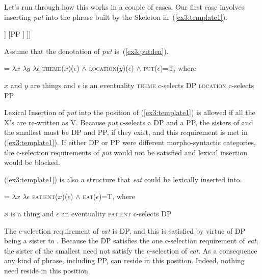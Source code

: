 Let's run through how this works in a couple of cases. Our first case involves inserting \emph{put} into the phrase built by the  Skeleton in~(\ref{ex3:template1}).
\begin{exe}
	\raggedright
	\ex \label{ex3:template1} 
	\small
	\begin{forest}
	[XP [\ibar{X}
		[\ibar{X} 
			[\obar{X} ]
			[DP ]
		]
		[PP ]
	]]
	\end{forest}
\end{exe}
Assume that the denotation of \emph{put} is~(\ref{ex3:putden}).
\begin{exe}
	\raggedright
	\ex \label{ex3:putden} 
	 = $\lambda x$ $\lambda y$ $\lambda \epsilon$ \textsc{theme}($x$)($\epsilon$) $\wedge$ \textsc{location}($y$)($\epsilon$) $\wedge$ \textsc{put}($\epsilon$)=T, where
	\begin{xlist}
		\ex $x$ and $y$ are things and $\epsilon$ is an eventuality
		\ex \textsc{theme} c-selects DP
		\ex \textsc{location} c-selects PP
	\end{xlist}
\end{exe}
Lexical Insertion of \emph{put} into the  position of (\ref{ex3:template1}) is allowed if all the X's are re-written as V. Because \emph{put} c-selects a DP and a PP, the sisters of  and the smallest  must be DP and PP, if they exist, and this requirement is met in (\ref{ex3:template1}). If either DP or PP were different morpho-syntactic categories, the c-selection requirements of \emph{put} would not be satisfied and lexical insertion would be blocked.
\pagebreak 

(\ref{ex3:template1}) is also a structure that \emph{eat} could be lexically inserted into. 
\begin{exe}
	\raggedright
	\ex \label{ex3:eatdena} 
	 = $\lambda x$ $\lambda \epsilon$ \textsc{patient}($x$)($\epsilon$) $\wedge$ \textsc{eat}($\epsilon$)=T, where
	\begin{xlist}
		\ex $x$ is a thing and $\epsilon$ an eventuality
		\ex \textsc{patient} c-selects DP
	\end{xlist}
\end{exe}
The c-selection requirement of \emph{eat} is DP, and this is satisfied by virtue of DP being a sister to . Because the DP satisfies the one c-selection requirement of \emph{eat}, the sister of the smallest  need not satisfy the c-selection of \emph{eat}. As a consequence any kind of phrase, including PP, can reside in this position. Indeed, nothing need reside in this position.


